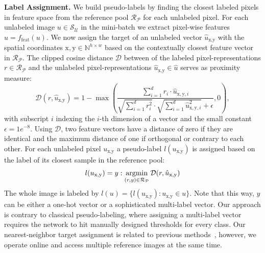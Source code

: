 \documentclass[letterpaper]{article} %
\def\argmin{\mathop{\rm argmin}}
\begin{document}
\noindent\textbf{Label Assignment.}
We build pseudo-labels by finding the closest labeled pixels in feature space from the reference pool $\mathcal{R}_{\mathcal{P}}$ for each unlabeled pixel.
For each unlabeled image $u \in \mathcal{S}_\mathcal{U}$ in the mini-batch we extract pixel-wise features $\hat u = f_{\text{feat}}(u)$.
We now assign the target of an unlabeled vector $\hat u_{\text{x},\text{y}} $ with the spatial coordinates $\text{x},\text{y} \in \mathbb{N}^{h \times w}$ based on the contextually closest feature vector in $\mathcal{R}_{\mathcal{P}}$.
The clipped cosine distance $\mathcal{D}$ between  of the labeled pixel-representations $r\in \mathcal{R}_{\mathcal{P}}$ and the unlabeled pixel-representations $\hat u_{\text{x},\text{y}} \in \hat u$ serves as proximity measure:
\begin{equation}
    \mathcal{D}(r,\hat u_{\text{x},\text{y}})  = 1 - \max(\frac{\sum_{i=1}^{d} r_i\cdot \hat u_{\text{x},\text{y},i}}{\sqrt{\sum_{i=1}^{d} r_i^2}\cdot \sqrt{\sum_{i=1}^{d}\hat u_{\text{x},\text{y},i}^2} + \epsilon },0),
\end{equation}
with subscript $i$ indexing the $i$-th dimension of a vector and the small constant $\epsilon=1e^{-8}$.
Using $\mathcal{D}$, two feature vectors have a distance of zero if they are identical and the maximum distance of one if orthogonal or contrary to each other.
For each unlabeled pixel $u_{\text{x},\text{y}}$ a pseudo-label $l(u_{\text{x},\text{y}})$ is assigned based on the label of its closest sample in the reference pool:
\begin{equation}\label{eq:pixellabel}
    l(u_{\text{x},\text{y}}) = y: \argmin_{(r,y) \in \mathcal{R}_\mathcal{P}} \mathcal{D}(r,\hat u_{\text{x},\text{y}})
\end{equation}
The whole image is labeled by $l(u) = \{l(u_{\text{x},\text{y}}): u_{\text{x},\text{y}} \in u\}$.
Note that this way, $y$ can be either a one-hot vector or a sophisticated multi-label vector.
Our approach is contrary to classical pseudo-labeling, where assigning a multi-label vector requires the network to hit manually designed thresholds for every class.
Our nearest-neighbor target assignment is related to previous methods~\cite{iscen2019label,liu2019deep, mechrez2018contextual}, however, we operate online and access multiple reference images at the same time.
\end{document}

